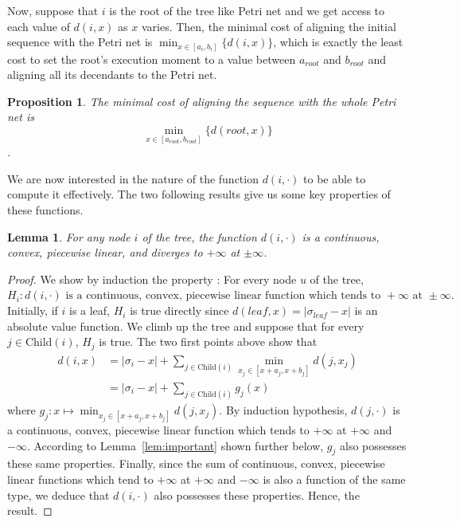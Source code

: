 \documentclass{article}
\newtheorem{lemma}{Lemma}
\newtheorem{proposition}{Proposition}
\begin{document}
Now, suppose that $i$ is the root of the tree like Petri net and we get access 
to each value of $d(i,x)$ as $x$ varies. Then, the minimal cost of aligning the 
initial sequence with the Petri net is $\min_{x\in[a_i,b_i]}\{d(i,x)\}$, which 
is exactly the least cost to set the root's execution moment to a value between
$a_{root}$ and $b_{root}$ and aligning all its decendants to the Petri net.

\begin{proposition}
    The minimal cost of aligning the sequence with the whole Petri net 
    is \[\min_{x\in[a_{root},b_{root}]}\{d(root,x)\}\]. 
\end{proposition}

We are now interested in the nature of the function $d(i,\cdot)$ to be able to compute it effectively. 
The two following results give us some key properties of these functions.

\begin{lemma} 
    For any node $i$ of the tree, the function $d(i,\cdot)$ is a continuous, convex, 
    piecewise linear, and diverges to $+\infty$ at $\pm\infty$.
\end{lemma}

\begin{proof}
    We show by induction the property : For every node $u$ of the 
    tree, $H_i: d(i,\cdot) \text{ is a continuous, convex, piecewise linear function 
    which tends to } +\infty \text{ at } \pm\infty.$
    Initially, if $i$ is a leaf, $H_i$ is true directly since 
    $d(leaf,x) = |\sigma_{leaf} - x|$ is an absolute value function. 
    We climb up the tree and suppose that for every 
    $j \in \text{Child}(i)$, $H_j$ is true. The two first points above show that
    \begin{equation}
        \begin{split}
            d(i,x) & = |\sigma_{i}-x| + \sum_{j \in \text{Child}(i)}\min_{x_{j}\in[x+a_{j},x+b_{j}]}d(j,x_{j}) \\
            & = |\sigma_{i}-x| + \sum_{j \in \text{Child}(i)}g_j(x)
        \end{split}
    \end{equation}
    where $g_j : x\mapsto \min_{x_{j}\in[x+a_{j},x+b_{j}]}d(j,x_{j})$. 
    By induction hypothesis, $d(j,\cdot)$ is a continuous, convex, piecewise linear function 
    which tends to $+\infty$ at $+\infty$ and $-\infty$. According to 
    Lemma~\ref{lem:important} shown further below, $g_j$ also possesses these same properties. 
    Finally, since the sum of continuous, convex, piecewise linear functions 
    which tend to $+\infty$ at $+\infty$ and $-\infty$ is also a 
    function of the same type, 
    we deduce that $d(i,\cdot)$ also possesses these properties. Hence, the result.
\end{proof}
\end{document}
